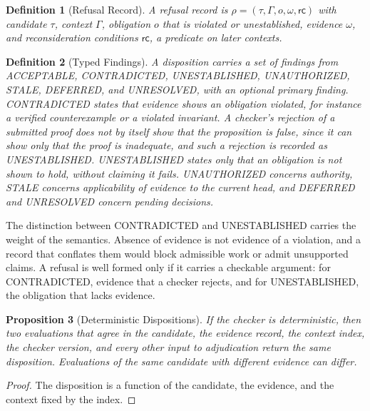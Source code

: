 \documentclass[12pt,oneside,openany]{book}
\theoremstyle{spherepop}
\newtheorem{definition}{Definition}[chapter]
\newtheorem{proposition}[definition]{Proposition}
\theoremstyle{remarkstyle}
\begin{document}
\begin{definition}[Refusal Record]
A \emph{refusal record} is $\rho=(\tau,\Gamma,o,\omega,\mathsf{rc})$ with candidate $\tau$, context $\Gamma$, obligation $o$ that is violated or unestablished, evidence $\omega$, and reconsideration conditions $\mathsf{rc}$, a predicate on later contexts.
\end{definition}

\begin{definition}[Typed Findings]
A disposition carries a set of findings from \textsf{ACCEPTABLE}, \textsf{CONTRADICTED}, \textsf{UNESTABLISHED}, \textsf{UNAUTHORIZED}, \textsf{STALE}, \textsf{DEFERRED}, and \textsf{UNRESOLVED}, with an optional primary finding. \textsf{CONTRADICTED} states that evidence shows an obligation violated, for instance a verified counterexample or a violated invariant. A checker's rejection of a submitted proof does not by itself show that the proposition is false, since it can show only that the proof is inadequate, and such a rejection is recorded as \textsf{UNESTABLISHED}. \textsf{UNESTABLISHED} states only that an obligation is not shown to hold, without claiming it fails. \textsf{UNAUTHORIZED} concerns authority, \textsf{STALE} concerns applicability of evidence to the current head, and \textsf{DEFERRED} and \textsf{UNRESOLVED} concern pending decisions.
\end{definition}

The distinction between \textsf{CONTRADICTED} and \textsf{UNESTABLISHED} carries the weight of the semantics. Absence of evidence is not evidence of a violation, and a record that conflates them would block admissible work or admit unsupported claims. A refusal is well formed only if it carries a checkable argument: for \textsf{CONTRADICTED}, evidence that a checker rejects, and for \textsf{UNESTABLISHED}, the obligation that lacks evidence.

\begin{proposition}[Deterministic Dispositions]
If the checker is deterministic, then two evaluations that agree in the candidate, the evidence record, the context index, the checker version, and every other input to adjudication return the same disposition. Evaluations of the same candidate with different evidence can differ.
\end{proposition}

\begin{proof}
The disposition is a function of the candidate, the evidence, and the context fixed by the index.
\end{proof}
\end{document}
